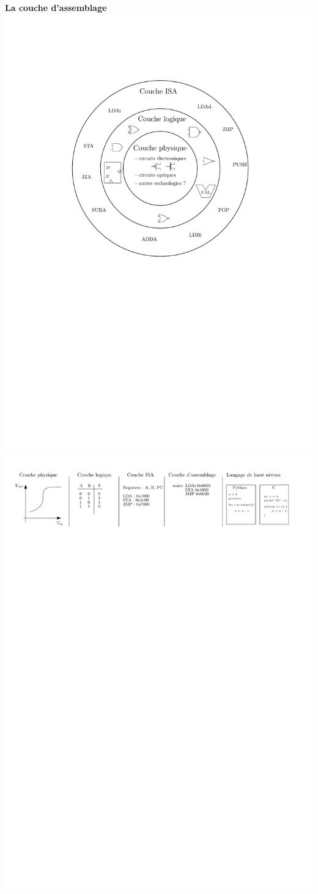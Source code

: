 \documentclass{beamer}
\begin{document}
\begin{frame}
\begin{center}
\textbf{La couche d'assemblage}\\
\centering\includegraphics[width=0.3\linewidth]{Figs/couches_architecture.pdf}\\
\centering\includegraphics[width=\linewidth]{Figs/couches_architecture_specif.pdf}
\end{center}
\end{frame}
\end{document}
